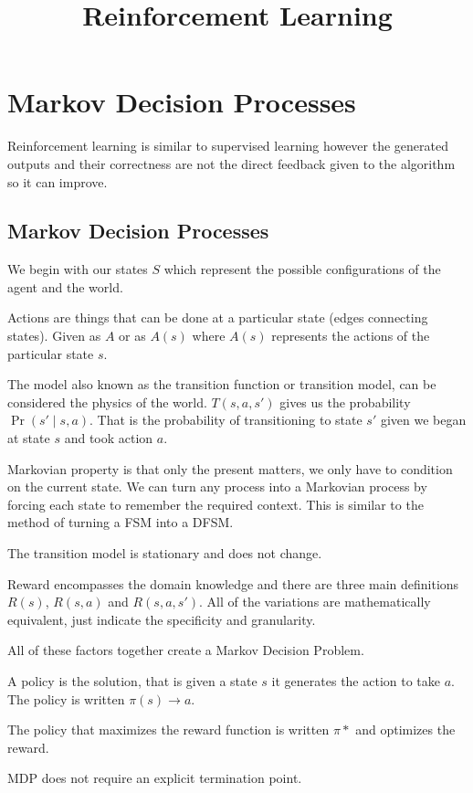 \documentclass{article}
\title{Reinforcement Learning}
\author{}
\date{}
\begin{document}
\nocite{*}
\maketitle
\section{Markov Decision Processes}
Reinforcement learning is similar to supervised learning however the generated 
outputs and their correctness are not the direct feedback given to the algorithm 
so it can improve. 

\subsection{Markov Decision Processes}

We begin with our states $S$ which represent the possible configurations of the
agent and the world. 

Actions are things that can be done at a particular state (edges connecting
states). Given as $A$ or as $A(s)$ where $A(s)$ represents the actions of the
particular state $s$.

The model also known as the transition function or transition model, can be
considered the physics of the world. $T(s,a,s')$ gives us the probability 
$\Pr(s'\mid s,a)$. That is the probability of transitioning to state $s'$ given
we began at state $s$ and took action $a$. 

Markovian property is that only the present matters, we only have to condition
on the current state. We can turn any process into a Markovian process by 
forcing each state to remember the required context. This is similar to the 
method of turning a FSM into a DFSM.

The transition model is stationary and does not change. 

Reward encompasses the domain knowledge and there are three main definitions
$R(s)$, $R(s,a)$ and $R(s,a,s')$. All of the variations are mathematically 
equivalent, just indicate the specificity and granularity. 

All of these factors together create a Markov Decision Problem. 

A policy is the solution, that is given a state $s$ it generates the action to 
take $a$. The policy is written $\pi(s) \rightarrow a$. 

The policy that maximizes the reward function is written $\pi*$ and optimizes
the reward. 

MDP does not require an explicit termination point. 
\end{document}
